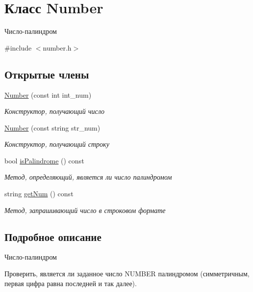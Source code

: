 \hypertarget{classNumber}{}\section{Класс Number}
\label{classNumber}


Число-\/палиндром  




{\ttfamily \#include $<$number.\+h$>$}

\subsection*{Открытые члены}
\begin{DoxyCompactItemize}
\item 
\hyperlink{classNumber_a28d6cb664f9bfcd450dd9323fd074556}{Number} (const int int\+\_\+num)
\begin{DoxyCompactList}\small\item\em Конструктор, получающий число \end{DoxyCompactList}\item 
\hyperlink{classNumber_ab216fbf150c9d518cd58bfaede23905c}{Number} (const string str\+\_\+num)
\begin{DoxyCompactList}\small\item\em Конструктор, получающий строку \end{DoxyCompactList}\item 
bool \hyperlink{classNumber_a701a60ec8b8d589b26f6c29b3368c2e2}{is\+Palindrome} () const 
\begin{DoxyCompactList}\small\item\em Метод, определяющий, является ли число палиндромом \end{DoxyCompactList}\item 
string \hyperlink{classNumber_a02b82dbf5dff1f4042f20a6cc9ea2ec0}{get\+Num} () const 
\begin{DoxyCompactList}\small\item\em Метод, запрашивающий число в строковом формате \end{DoxyCompactList}\end{DoxyCompactItemize}


\subsection{Подробное описание}
Число-\/палиндром 

Проверить, является ли заданное число N\+U\+M\+B\+E\+R палиндромом (симметричным, первая цифра равна последней и так далее). 

